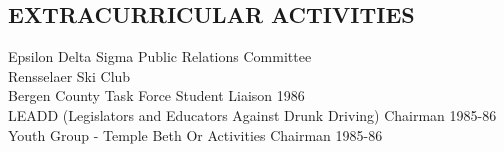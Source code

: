 \documentclass{res}
\begin{document}
\begin{resume}
\section{EXTRACURRICULAR ACTIVITIES}
    Epsilon Delta Sigma Public Relations Committee \\
    Rensselaer Ski Club     \\
    Bergen County Task Force Student Liaison 1986  \\
    LEADD (Legislators and Educators Against Drunk Driving) Chairman
     1985-86  \\
    Youth Group - Temple Beth Or Activities Chairman 1985-86

\end{resume}
\end{document}
